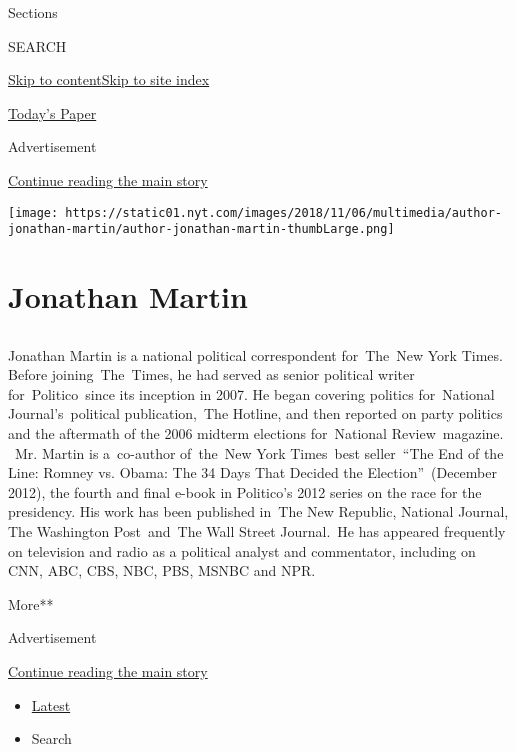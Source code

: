 Sections

SEARCH

\protect\hyperlink{site-content}{Skip to
content}\protect\hyperlink{site-index}{Skip to site index}

\href{https://myaccount.nytimes.com/auth/login?response_type=cookie\&client_id=vi}{}

\href{https://www.nytimes.com/section/todayspaper}{Today's Paper}

Advertisement

\protect\hyperlink{after-top}{Continue reading the main story}

\texttt{[image: https://static01.nyt.com/images/2018/11/06/multimedia/author-jonathan-martin/author-jonathan-martin-thumbLarge.png]}

\hypertarget{jonathan-martin}{%
\section{Jonathan Martin}\label{jonathan-martin}}

\subsection{}

Jonathan Martin is a national political correspondent for~The~New York
Times. Before joining~The~Times, he had served as senior political
writer for~Politico~since its inception in 2007. He began covering
politics for~National Journal's~political publication,~The Hotline, and
then reported on party politics and the aftermath of the 2006 midterm
elections for~National Review~magazine. ~Mr. Martin is a~co-author
of~the~New York Times~best seller~``The End of the Line: Romney vs.
Obama: The 34 Days That Decided the Election''~(December 2012), the
fourth and final e-book in Politico's 2012 series on the race for the
presidency. His work has been published in~The New Republic, National
Journal, The Washington Post~and~The Wall Street Journal.~He has
appeared frequently on television and radio as a political analyst and
commentator, including on CNN, ABC, CBS, NBC, PBS, MSNBC and NPR.

More**

Advertisement

\protect\hyperlink{after-mid1}{Continue reading the main story}

\begin{itemize}
\tightlist
\item
  \protect\hyperlink{stream-panel}{Latest}
\item
  Search
\end{itemize}

